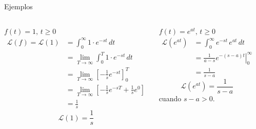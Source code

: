\documentclass[9pt, aspectratio=169]{beamer}
\begin{document}
\begin{frame}{Ejemplos}
	\begin{columns}[t]
		\cx
		$f(t) = 1, \, t \geq 0$
		\begin{align*}
			\mathscr{L}(f) = \mathscr{L}(1) & = \int_0^{\infty} 1 \cdot e^{-st} \, dt                                                      \\
			                                & = \lim_{T \rightarrow \infty} \int_0^T 1 \cdot e^{-s t} \, dt                        \\
			                                & = \lim_{T \rightarrow \infty} \left[ -\frac{1}{s} e^{-s t} \right]_0^T               \\
			                                & = \lim_{T \rightarrow \infty} \left[ -\frac{1}{s} e^{-s T} + \frac{1}{s} e^0 \right] \\
			                                & = \frac{1}{s}
		\end{align*}
		\[ \boxed{ \mathscr{L}(1) = \frac{1}{s} } \]
		\pause

		\cx
		$f(t) = e^{at}, \, t \geq 0$
		\begin{align*}
			\mathscr{L} (e^{at}) & = \int_0^{\infty} e^{-st} \, e^{at} \, dt               \\
			                     & = \left. \frac{1}{a - s} e^{-(s-a)t} \right|_0^{\infty} \\
			                     & = \frac{1}{s -a}
		\end{align*}
		\[ \boxed{ \mathscr{L}(e^{at}) = \frac{1}{s -a}} \]
		cuando $s -a > 0$.
	\end{columns}
\end{frame}
\end{document}

